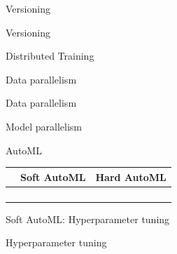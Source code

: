 \begin{frame}{Versioning}
  \begin{tdcodet}{Versioning}
  \end{tdcodet}
\end{frame}

\begin{frame}{Distributed Training}
  \begin{withmargin}
    \begin{tdmain}
    \end{tdmain}
    \begin{tdmargin}
    \end{tdmargin}
  \end{withmargin}
\end{frame}

\begin{frame}{Data parallelism}
  \begin{tddef}{Data parallelism}
  \end{tddef}
\end{frame}

\begin{frame}{Model parallelism}
  \begin{sidebody}
  \end{sidebody}
\end{frame}

\begin{frame}{AutoML}
  \footnotesize
  \renewcommand{\arraystretch}{1.25}
  \begin{tabular}{@{}%
    >{\raggedright\arraybackslash}p{}%
    >{\raggedright\arraybackslash}p{}%
    >{\raggedright\arraybackslash}p{}@{}}
    \toprule
     & \textbf{Soft AutoML} & \textbf{Hard AutoML}\\
    \midrule
     & & \\
     & & \\
     & & \\
     & & \\
    \bottomrule
  \end{tabular}
\end{frame}

\begin{frame}{Soft AutoML: Hyperparameter tuning}
  \begin{tdcodet}{Hyperparameter tuning}
  \end{tdcodet}
\end{frame}

